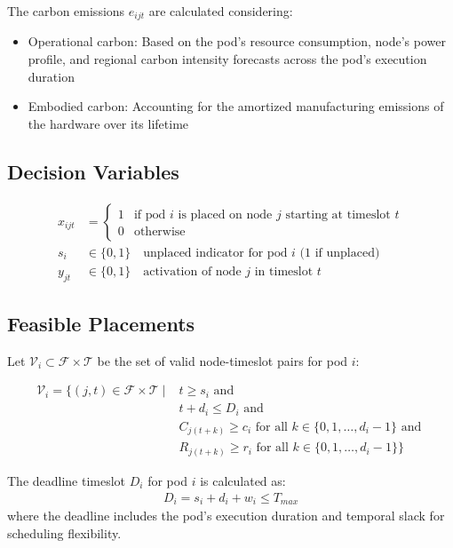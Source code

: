\documentclass{article}
\begin{document}
The carbon emissions $e_{ijt}$ are calculated considering:
\begin{itemize}
  \item Operational carbon: Based on the pod's resource consumption, node's power profile, and regional carbon intensity forecasts across the pod's execution duration
  \item Embodied carbon: Accounting for the amortized manufacturing emissions of the hardware over its lifetime
\end{itemize}

\subsection{Decision Variables}

\begin{align}
x_{ijt} &= 
\begin{cases} 
1 & \text{if pod $i$ is placed on node $j$ starting at timeslot $t$} \\
0 & \text{otherwise}
\end{cases} \\
s_i &\in \{0,1\} \quad \text{unplaced indicator for pod $i$ (1 if unplaced)} \\
y_{jt} &\in \{0,1\} \quad \text{activation of node $j$ in timeslot $t$}
\end{align}

\subsection{Feasible Placements}

Let $\mathcal{V}_i \subset \mathcal{F} \times \mathcal{T}$ be the set of valid node-timeslot pairs for pod $i$:

\begin{align}
\mathcal{V}_i = \{(j,t) \in \mathcal{F} \times \mathcal{T} \mid 
& t \geq s_i \text{ and } \\
& t + d_i \leq D_i \text{ and } \\
& C_{j(t+k)} \geq c_i \text{ for all } k \in \{0,1,\ldots,d_i-1\} \text{ and } \\
& R_{j(t+k)} \geq r_i \text{ for all } k \in \{0,1,\ldots,d_i-1\} \}
\end{align}

The deadline timeslot $D_i$ for pod $i$ is calculated as:
\begin{align}
D_i = s_i + d_i + w_i \leq T_{max}
\end{align}
where the deadline includes the pod's execution duration and temporal slack for scheduling flexibility.
\end{document}
